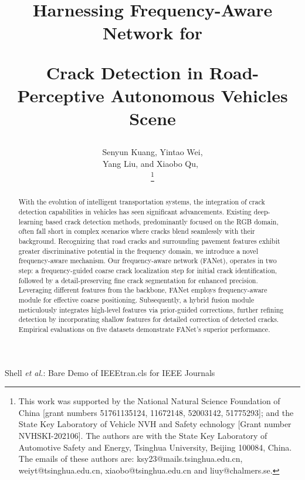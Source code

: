 \documentclass[journal]{IEEEtran}
\begin{document}
\title{Harnessing Frequency-Aware Network for 

Crack Detection in Road-Perceptive Autonomous Vehicles Scene}


\author{Senyun Kuang, Yintao Wei,

Yang Liu, and Xiaobo Qu,~

\thanks{This work was supported by the National Natural Science Foundation of China [grant numbers 51761135124, 11672148, 52003142, 51775293]; and the State Key Laboratory of Vehicle NVH and Safety echnology [Grant number NVHSKI-202106]. The authors are with the State Key Laboratory of Automotive Safety and Energy, Tsinghua University, Beijing 100084, China. The emails of these authors are: ksy23@mails.tsinghua.edu.cn, weiyt@tsinghua.edu.cn, xiaobo@tsinghua.edu.cn and liuy@chalmers.se.}}

%
{Shell \MakeLowercase{\textit{et al.}}: Bare Demo of IEEEtran.cls for IEEE Journals}

\maketitle


\begin{abstract}
With the evolution of intelligent transportation systems, the integration of crack detection capabilities in vehicles has seen significant advancements. Existing deep-learning based crack detection methods, predominantly focused on the RGB domain, often fall short in complex scenarios where cracks blend seamlessly with their background. Recognizing that road cracks and surrounding pavement features exhibit greater discriminative potential in the frequency domain, we introduce a novel frequency-aware mechanism. Our frequency-aware network (FANet), operates in two step: a frequency-guided coarse crack localization step for initial crack identification, followed by a detail-preserving fine crack segmentation for enhanced precision. Leveraging different features from the backbone, FANet employs frequency-aware module for effective coarse positioning. Subsequently, a hybrid fusion module meticulously integrates high-level features via prior-guided corrections, further refining detection by incorporating shallow features for detailed correction of detected cracks. Empirical evaluations on five datasets demonstrate FANet's superior performance.
\end{abstract}
\end{document}
